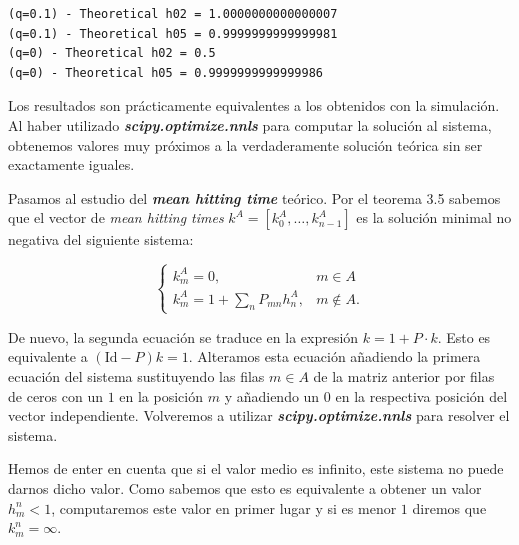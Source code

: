 \documentclass[11pt]{article}
\begin{document}
    \begin{Verbatim}[commandchars=\\\{\}]
(q=0.1) - Theoretical h02 = 1.0000000000000007
(q=0.1) - Theoretical h05 = 0.9999999999999981
(q=0) - Theoretical h02 = 0.5
(q=0) - Theoretical h05 = 0.9999999999999986
    \end{Verbatim}

    Los resultados son prácticamente equivalentes a los obtenidos con la
simulación. Al haber utilizado \textbf{\emph{scipy.optimize.nnls}} para
computar la solución al sistema, obtenemos valores muy próximos a la
verdaderamente solución teórica sin ser exactamente iguales.

Pasamos al estudio del \textbf{\emph{mean hitting time}} teórico. Por el
teorema 3.5 sabemos que el vector de \emph{mean hitting times}
\(k^A = [k_0^A, \ldots, k_{n-1}^A]\) es la solución minimal no negativa
del siguiente sistema:

\[
\begin{cases}
  k_m^{A} = 0, & m \in A\\
  k_m^{A} = 1 + \sum_{n} P_{mn}h_n^{A}, & m \notin A.
\end{cases}
\]

De nuevo, la segunda ecuación se traduce en la expresión
\(k = 1 + P \cdot k\). Esto es equivalente a \((\text{Id} - P)k = 1\).
Alteramos esta ecuación añadiendo la primera ecuación del sistema
sustituyendo las filas \(m \in A\) de la matriz anterior por filas de
ceros con un \(1\) en la posición \(m\) y añadiendo un \(0\) en la
respectiva posición del vector independiente. Volveremos a utilizar
\textbf{\emph{scipy.optimize.nnls}} para resolver el sistema.

Hemos de enter en cuenta que si el valor medio es infinito, este sistema
no puede darnos dicho valor. Como sabemos que esto es equivalente a
obtener un valor \(h_m^n < 1\), computaremos este valor en primer lugar
y si es menor \(1\) diremos que \(k_m^n = \infty\).
\end{document}
